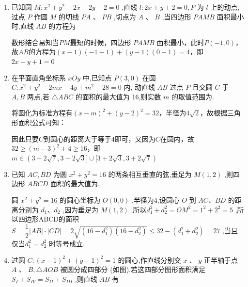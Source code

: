 \begin{enumerate}
\begin{jieda}
        根据对称性可知$\left| {A{F}_{1}}\right|  + \left| {B{F}_{1}}\right| = 2a$. 因为$a^2 = b^2+c^2 \geq 2bc = 4$，所以$2a$最小值为$4$.
    \end{jieda}
    \item 已知圆 $M : {x}^{2} + {y}^{2} - {2x} - {2y} - 2 = 0$ ,直线 $l : {2x} + y + 2 = 0,P$ 为 $l$ 上的动点,过点 $P$ 作圆 $M$ 的切线 ${PA}$ 、 ${PB}$ ,切点为 $A$ 、 $B$ ,当四边形 ${PAMB}$ 面积最小时,直线 ${AB}$ 的方程为 
    \begin{jieda}
        数形结合易知当$PM$最短的时候，四边形 ${PAMB}$ 面积最小，此时$P(-1, 0)$，故$AB$的方程为$(x-1)(-1-1) + (y-1)(0-1) = 4$，即${2x} + y + 1 = 0$
    \end{jieda}
    \item 在平面直角坐标系 ${xOy}$ 中,已知点 $P\left( {3,0}\right)$ 在圆 $C : {x}^{2} + {y}^{2} - {2mx} - {4y} + {m}^{2} - {28} = 0$ 内, 动直线 ${AB}$ 过点 $P$ 且交圆 $C$ 于 $A,B$ 两点,若 $\bigtriangleup {ABC}$ 的面积的最大值为 16,则实数 $m$ 的取值范围为\blkda[8]{$ (3-2\sqrt{7}, 3-2\sqrt{3}] \cup [3+2\sqrt{3}, 3+2\sqrt{7})$}.
    \begin{jieda}
        将圆化为标准方程有$(x-m)^2+(y-2)^2 = 32$，半径为$4\sqrt{2}$，故根据三角形面积公式可知：
        因此只要$C$到圆心的距离大于等于4即可，又因为$C$在圆内，故$32 \geq (m-3)^2 + 4 \geq 16$，即$m \in (3-2\sqrt{7}, 3-2\sqrt{3}] \cup [3+2\sqrt{3}, 3+2\sqrt{7})$
    \end{jieda}
    \item 已知 ${AC},{BD}$ 为圆 ${x}^{2} + {y}^{2} = {16}$ 的两条相互垂直的弦,垂足为 $M\left( {1,2}\right)$ ,则四边形 ${ABCD}$ 面积的最大值为.
    \begin{jieda}
        圆 ${x^2} + {y^2} = {16}$ 的圆心坐标为 $O\left( {0,0}\right)$ ,半径为4,设圆心 $O$ 到 ${AC}\text{、}{BD}$ 的距离分别为 ${d}_{1}\text{、}{d}_{2}$ ,因为垂足为 $M\left( {1,2}\right)$ ,所以${d}_1^2 + {d}_2^2 = O{M}^{2} = {1}^{2} + {2}^{2} = 5$ ,所以四边形ABCD的面积 $S = \dfrac{1}{2}\left| {AB}\right|  \cdot  \left| {CD}\right|  = 2\sqrt{\left( {{16} - {d}_{1}^{2}}\right) \left( {{16} - {d}_{2}^{2}}\right) } \leq  {32} - \left( {{d}_{1}^{2} + {d}_{2}^{2}}\right)  = 27$ ,当且仅当${d}_{1}^2 = {d}_{2}^2$ 时等号成立.
    \end{jieda}
    \item 过圆 $C : {\left( x - 1\right) }^{2} + {\left( y - 1\right) }^{2} = 1$ 的圆心,作直线分别交 $x$ 、 $y$ 正半轴于点 $A$ 、 $B,\bigtriangleup {AOB}$ 被圆分成四部分 (如图),若这四部分图形面积满足 ${S}_{{I}} + {S}_{{IV}} = {S}_{{{II}}} + {S}_{{{III}}}$ ,则直线 ${AB}$ 有


\end{enumerate}
